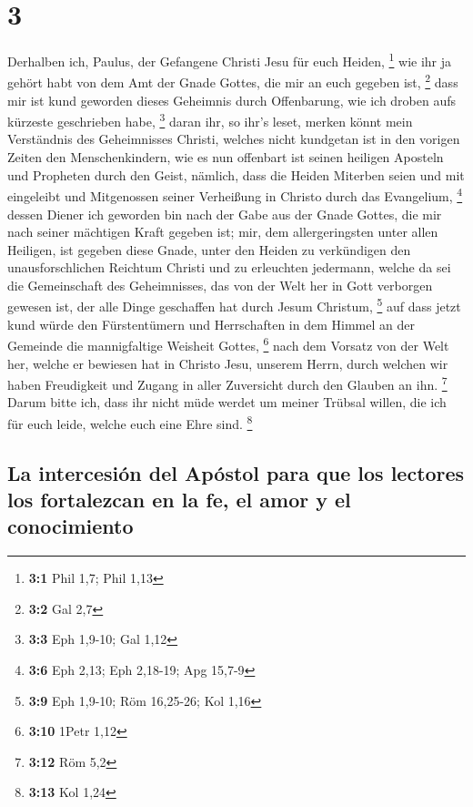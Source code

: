 \hypertarget{section-2}{%
\section{3}\label{section-2}}

 Derhalben ich, Paulus, der Gefangene Christi Jesu für
euch Heiden, \footnote{\textbf{3:1} Phil 1,7; Phil 1,13} 
wie ihr ja gehört habt von dem Amt der Gnade Gottes, die mir an euch
gegeben ist, \footnote{\textbf{3:2} Gal 2,7}  dass mir ist
kund geworden dieses Geheimnis durch Offenbarung, wie ich droben aufs
kürzeste geschrieben habe, \footnote{\textbf{3:3} Eph 1,9-10; Gal 1,12}
 daran ihr, so ihr's leset, merken könnt mein Verständnis
des Geheimnisses Christi,  welches nicht kundgetan ist in
den vorigen Zeiten den Menschenkindern, wie es nun offenbart ist seinen
heiligen Aposteln und Propheten durch den Geist,  nämlich,
dass die Heiden Miterben seien und mit eingeleibt und Mitgenossen seiner
Verheißung in Christo durch das Evangelium, \footnote{\textbf{3:6} Eph
  2,13; Eph 2,18-19; Apg 15,7-9}  dessen Diener ich
geworden bin nach der Gabe aus der Gnade Gottes, die mir nach seiner
mächtigen Kraft gegeben ist;  mir, dem allergeringsten
unter allen Heiligen, ist gegeben diese Gnade, unter den Heiden zu
verkündigen den unausforschlichen Reichtum Christi  und zu
erleuchten jedermann, welche da sei die Gemeinschaft des Geheimnisses,
das von der Welt her in Gott verborgen gewesen ist, der alle Dinge
geschaffen hat durch Jesum Christum, \footnote{\textbf{3:9} Eph 1,9-10;
  Röm 16,25-26; Kol 1,16}  auf dass jetzt kund würde den
Fürstentümern und Herrschaften in dem Himmel an der Gemeinde die
mannigfaltige Weisheit Gottes, \footnote{\textbf{3:10} 1Petr 1,12}
 nach dem Vorsatz von der Welt her, welche er bewiesen
hat in Christo Jesu, unserem Herrn,  durch welchen wir
haben Freudigkeit und Zugang in aller Zuversicht durch den Glauben an
ihn. \footnote{\textbf{3:12} Röm 5,2}  Darum bitte ich,
dass ihr nicht müde werdet um meiner Trübsal willen, die ich für euch
leide, welche euch eine Ehre sind. \footnote{\textbf{3:13} Kol 1,24}

\hypertarget{la-intercesiuxf3n-del-apuxf3stol-para-que-los-lectores-los-fortalezcan-en-la-fe-el-amor-y-el-conocimiento}{%
\subsection{La intercesión del Apóstol para que los lectores los
fortalezcan en la fe, el amor y el
conocimiento}\label{la-intercesiuxf3n-del-apuxf3stol-para-que-los-lectores-los-fortalezcan-en-la-fe-el-amor-y-el-conocimiento}}


